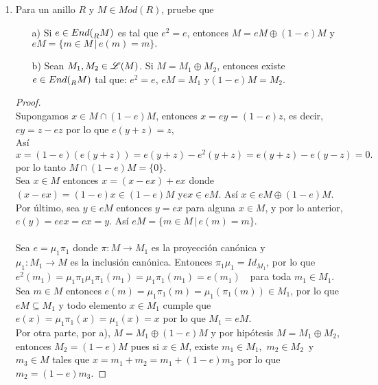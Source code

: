 \documentclass{article}
\begin{document}
\begin{enumerate}[label=\textbf{Ej \arabic*.}]
		\item Para un anillo $R$ y $M\in Mod(R)$, pruebe que 
		\begin{itemize}
			\item[a)] Si $e\in End(\prescript{}{R}{M})$ es tal que $e^2=e$, entonces $M=eM\oplus (1-e)M$ y $eM=\{m\in M\,|\, e(m)=m\}.$
			\item[b)] Sean $M_1,M_2\in \mathscr{L}(M)$. Si $M=M_1\oplus M_2$, entonces existe\\ $e\in End(\prescript{}{R}{M})$ tal que: $e^2=e$, $eM=M_1$\quad
			y\quad $(1-e)M=M_2$.
		\end{itemize}
		\begin{proof}
			\\
			Supongamos $x\in M\cap(1-e)M$, entonces $x=ey=(1-e)z$, es decir, $ey=z-ez$ por lo que $e(y+z)=z$,\\
			Así \[x=(1-e)(e(y+z))=e(y+z)-e^2(y+z)=e(y+z)-e(y-z)=0.
			\]
			por lo tanto $M\cap (1-e)M=\{0\}.$\\
			
			Sea $x\in M$ entonces $x=(x-ex)+ex$ donde $(x-ex)=(1-e)x\in (1-e)M$ y\quad $ex\in eM$. Así $x\in eM\oplus (1-e)M$.\\
			
			Por último, sea $y\in eM$ entonces $y=ex$ para alguna $x\in M$, y por lo anterior, $e(y)=eex=ex=y$. Así $eM=\{m\in M\,|\, e(m)=m\}.$\\
			\\
			Sea $e=\mu_1\pi_1$ donde $\pi\colon M\longrightarrow M_1$ es la proyección canónica y \\$\mu_1\colon M_1\longrightarrow M$ es la 
			inclusión canónica. Entonces $\pi_1\mu_1=Id_{M_1}$, por lo que $e^2(m_1)=\mu_1\pi_1\mu_1\pi_1(m_1)=\mu_1\pi_1(m_1)=e(m_1)$ \,\,
			para toda $m_1\in M_1$.\\
			
			Sea $m\in M$ entonces $e(m)=\mu_1\pi_1(m)=\mu_1(\pi_1(m))\in M_1$, por lo que $eM\subseteq M_1$ y todo elemento $x\in M_1$ cumple 
			que\\$e(x)=\mu_1\pi_1(x)=\mu_1(x)=x$ por lo que $M_1=eM$.\\
			
			Por otra parte, por a), $M=M_1\oplus(1-e)M$ y por hipótesis $M=M_1\oplus M_2$, entonces $M_2=(1-e)M$ pues si $x\in M$, existe $m_1\in M_1,\,\,
			m_2\in M_2\,$ y $m_3\in M$ tales que $x=m_1+m_2=m_1+(1-e)m_3$ por lo que $m_2=(1-e)m_3$.
		\end{proof}
		

\end{enumerate}
\end{document}
